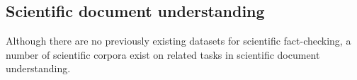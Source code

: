 

% 






\subsection{Scientific document understanding} \label{sec:scidoc}

Although there are no previously existing datasets for scientific fact-checking, a number of scientific corpora exist on related tasks in scientific document understanding.


